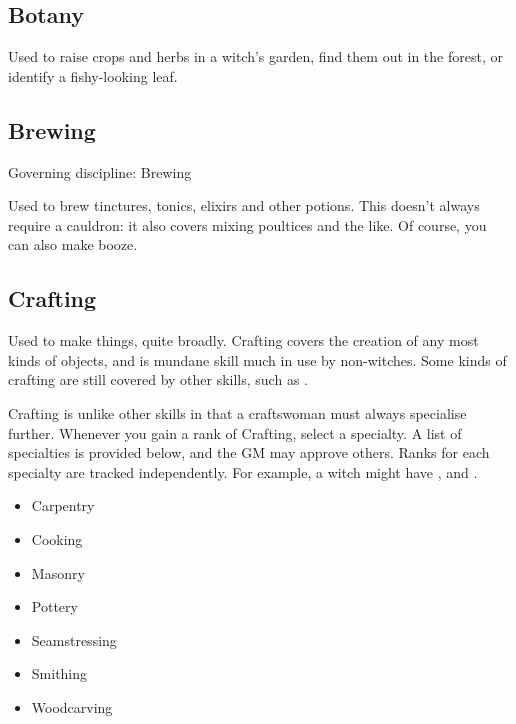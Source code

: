 \newcommand\govdisc[1]{Governing discipline: #1} %

\subsection{Botany}

Used to raise crops and herbs in a witch's garden, find them out in the forest, or identify a fishy-looking leaf.

\subsection{Brewing}
\govdisc{Brewing}

Used to brew tinctures, tonics, elixirs and other potions.
This doesn't always require a cauldron: it also covers mixing poultices and the like.
Of course, you can also make booze.

\subsection{Crafting}

Used to make things, quite broadly.
Crafting covers the creation of any most kinds of objects, and is mundane skill much in use by non-witches.
Some kinds of crafting are still covered by other skills, such as .

Crafting is unlike other skills in that a craftswoman must always specialise further.
Whenever you gain a rank of Crafting, select a specialty.
A list of specialties is provided below, and the GM may approve others.
Ranks for each specialty are tracked independently.
For example, a witch might have ,  and .

\begin{itemize}
	\item Carpentry
	\item Cooking
	\item Masonry
	\item Pottery
	\item Seamstressing
	\item Smithing
	\item Woodcarving
\end{itemize}

